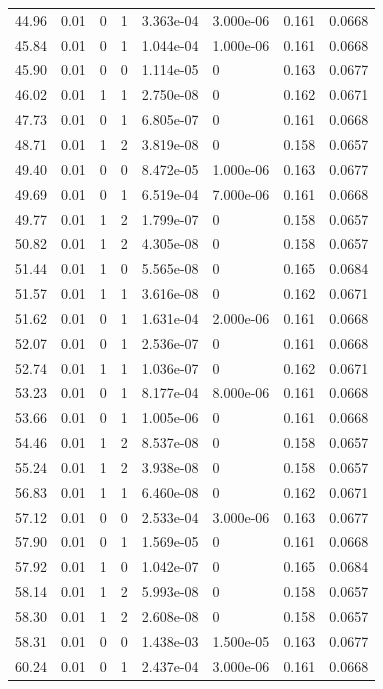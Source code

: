 \documentclass[preview]{standalone}
\begin{document}
{{{\begin{tabular}{L{1.2cm}C{1.2cm} C{0.3cm}C{0.5cm} C{1.4cm}C{1.4cm} C{1.4cm}C{1.4cm}}
  44.96  &  0.01  & 0     &  1 &  3.363e-04  & 3.000e-06  & 0.161 &  0.0668   \\ 
  45.84  &  0.01  & 0     &  1 &  1.044e-04  & 1.000e-06  & 0.161 &  0.0668   \\ 
  45.90  &  0.01  & 0     &  0 &  1.114e-05  & 0  & 0.163 &  0.0677   \\ 
  46.02  &  0.01  & 1     &  1 &  2.750e-08  & 0  & 0.162 &  0.0671   \\ 
  47.73  &  0.01  & 0     &  1 &  6.805e-07  & 0  & 0.161 &  0.0668   \\ 
  48.71  &  0.01  & 1     &  2 &  3.819e-08  & 0  & 0.158 &  0.0657   \\ 
  49.40  &  0.01  & 0     &  0 &  8.472e-05  & 1.000e-06  & 0.163 &  0.0677   \\ 
  49.69  &  0.01  & 0     &  1 &  6.519e-04  & 7.000e-06  & 0.161 &  0.0668   \\ 
  49.77  &  0.01  & 1     &  2 &  1.799e-07  & 0  & 0.158 &  0.0657   \\ 
  50.82  &  0.01  & 1     &  2 &  4.305e-08  & 0  & 0.158 &  0.0657   \\ 
  51.44  &  0.01  & 1     &  0 &  5.565e-08  & 0  & 0.165 &  0.0684   \\ 
  51.57  &  0.01  & 1     &  1 &  3.616e-08  & 0  & 0.162 &  0.0671   \\ 
  51.62  &  0.01  & 0     &  1 &  1.631e-04  & 2.000e-06  & 0.161 &  0.0668   \\ 
  52.07  &  0.01  & 0     &  1 &  2.536e-07  & 0  & 0.161 &  0.0668   \\ 
  52.74  &  0.01  & 1     &  1 &  1.036e-07  & 0  & 0.162 &  0.0671   \\ 
  53.23  &  0.01  & 0     &  1 &  8.177e-04  & 8.000e-06  & 0.161 &  0.0668   \\ 
  53.66  &  0.01  & 0     &  1 &  1.005e-06  & 0  & 0.161 &  0.0668   \\ 
  54.46  &  0.01  & 1     &  2 &  8.537e-08  & 0  & 0.158 &  0.0657   \\ 
  55.24  &  0.01  & 1     &  2 &  3.938e-08  & 0  & 0.158 &  0.0657   \\ 
  56.83  &  0.01  & 1     &  1 &  6.460e-08  & 0  & 0.162 &  0.0671   \\ 
  57.12  &  0.01  & 0     &  0 &  2.533e-04  & 3.000e-06  & 0.163 &  0.0677   \\ 
  57.90  &  0.01  & 0     &  1 &  1.569e-05  & 0  & 0.161 &  0.0668   \\ 
  57.92  &  0.01  & 1     &  0 &  1.042e-07  & 0  & 0.165 &  0.0684   \\ 
  58.14  &  0.01  & 1     &  2 &  5.993e-08  & 0  & 0.158 &  0.0657   \\ 
  58.30  &  0.01  & 1     &  2 &  2.608e-08  & 0  & 0.158 &  0.0657   \\ 
  58.31  &  0.01  & 0     &  0 &  1.438e-03  & 1.500e-05  & 0.163 &  0.0677   \\ 
  60.24  &  0.01  & 0     &  1 &  2.437e-04  & 3.000e-06  & 0.161 &  0.0668   \\ 
\hline 
\end{tabular} 

}}}
\end{document}
